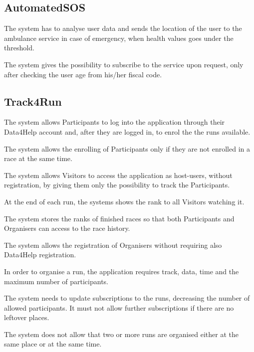 \subsection{AutomatedSOS}

\begin{enumerate}[label={[}R2.\arabic*{]}, leftmargin=*]

    \item The system has to analyse user data and sends the location of the user to the ambulance service in case of emergency, when health values goes under the threshold.
    
    \item The system gives the possibility to subscribe to the service upon request, only after checking the user age from his/her fiscal code.
\end{enumerate}


\subsection{Track4Run}

\begin{enumerate}[label={[}R3.\arabic*{]}, leftmargin=*]

    \item The system allows Participants to log into the application through their Data4Help account and, after they are logged in, to enrol the the runs available.
    
    \item The system allows the enrolling of Participants only if they are not enrolled in a race at the same time.
    
    \item The system allows Visitors to access the application as host-users, without registration, by giving them only the possibility to track the Participants.
    
    \item At the end of each run, the systems shows the rank to all Visitors watching it.
    
    \item The system stores the ranks of finished races so that both Participants and Organisers can access to the race history.
    
    \item The system allows the registration of Organisers without requiring also Data4Help registration.
    
    \item In order to organise a run, the application requires track, data, time and the maximum number of participants.
    
    \item The system needs to update subscriptions to the runs, decreasing the number of allowed participants. It must not allow further subscriptions if there are no leftover places.
    
    \item The system does not allow that two or more runs are organised either at the same place or at the same time.

\end{enumerate}